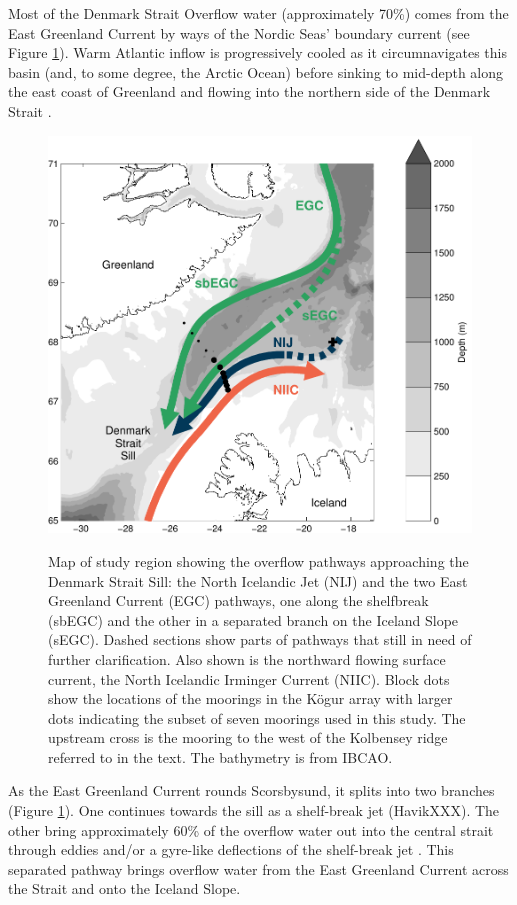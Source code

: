 \documentclass[12pt,titlepage,figuresatend]{article}
\begin{document}
Most of the Denmark Strait Overflow water (approximately 70\%) comes from the East Greenland Current by ways of the Nordic Seas’ boundary current \cite[]{Vage2013,Harden2016} (see Figure \ref{mainmap}). Warm Atlantic inflow is progressively cooled as it circumnavigates this basin (and, to some degree, the Arctic Ocean) before sinking to mid-depth along the east coast of Greenland and flowing into the northern side of the Denmark Strait \cite[]{Mauritzen1996}. 

\begin{figure}[p!]
  \centering\includegraphics[width=.9\hsize]{./figures/mainmap.pdf}
  \caption{Map of study region showing the overflow pathways approaching the Denmark Strait Sill: the North Icelandic Jet (NIJ) and the two East Greenland Current (EGC) pathways, one along the shelfbreak (sbEGC) and the other in a separated branch on the Iceland Slope (sEGC). Dashed sections show parts of pathways that still in need of further clarification. Also shown is the northward flowing surface current, the North Icelandic Irminger Current (NIIC). Block dots show the locations of the moorings in the K\"{o}gur array with larger dots indicating the subset of seven moorings used in this study. The upstream cross is the mooring to the west of the Kolbensey ridge referred to in the text. The bathymetry is from IBCAO.}{\label{mainmap}}
\end{figure}

As the East Greenland Current rounds Scorsbysund, it splits into two branches (Figure \ref{mainmap}). One continues towards the sill as a shelf-break jet (HavikXXX). The other bring approximately 60\% of the overflow water out into the central strait through eddies and/or a gyre-like deflections of the shelf-break jet \cite[]{Vage2013,Harden2016}. This separated pathway brings overflow water from the East Greenland Current across the Strait and onto the Iceland Slope.
\end{document}
